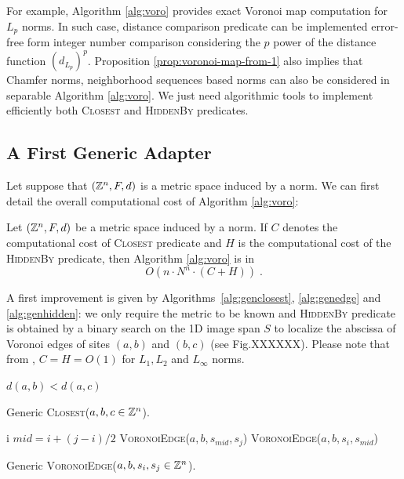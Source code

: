 \documentclass{llncs}
\begin{document}
For example, Algorithm \ref{alg:voro} provides exact Voronoi map
computation for $L_p$ norms. In such case, distance comparison
predicate can be implemented error-free form integer number comparison
considering the $p$ power of the distance function $\left
(d_{L_p}\right)^p$.  Proposition \ref{prop:voronoi-map-from-1} also
implies that Chamfer norms, neighborhood sequences based norms can
also be considered in separable Algorithm \ref{alg:voro}. We just need
algorithmic tools to implement efficiently both \textsc{Closest} and
\textsc{HiddenBy} predicates.

\subsection{A First Generic Adapter}
\label{sec:first-gener-adapt}

Let suppose that $({\mathbb{Z}}^n,F,d)$ is a metric space induced by a norm. We
can first detail the overall computational cost of Algorithm
\ref{alg:voro}:

\begin{lemma}
\label{lem:generic}
   Let $({\mathbb{Z}}^n, F, d)$ be a metric space induced by a norm. If $C$
  denotes the computational cost of \textsc{Closest} predicate and $H$
  is the computational cost of the \textsc{HiddenBy} predicate, then
  Algorithm \ref{alg:voro} is in
  \begin{equation}
    O(n\cdot N^n\cdot (C+H))\;.
  \end{equation}
\end{lemma}


A first improvement is given by Algorithms~\ref{alg:genclosest},
\ref{alg:genedge} and \ref{alg:genhidden}: we only require the metric
to be known and \textsc{HiddenBy} predicate is obtained by a binary
search on the 1D image span $S$ to localize the abscissa of Voronoi
edges of sites $(a,b)$ and $(b,c)$ (see Fig.XXXXXX). Please note that
from \cite{Breu1995,roerdnik}, $C=H=O(1)$ for $L_1,L_2$ and $L_\infty$
norms.



\begin{algorithm}[H]\small
  \Return $d(a,b) < d(a,c)$\;
  \caption{Generic \textsc{Closest}($a,b,c\in{\mathbb{Z}}^n$).\label{alg:genclosest}}
\end{algorithm}


\begin{algorithm}[H]\small
     {
       \Return  i
     }
     $mid  = i + (j-i)/2$\;
       {
         \Return \textsc{VoronoiEdge}($a,b,s_{mid},s_j$)
}
 {
         \Return \textsc{VoronoiEdge}($a,b,s_{i},s_{mid}$)
}

  \caption{Generic \textsc{VoronoiEdge}($a,b,s_i,s_j\in{\mathbb{Z}}^n$).\label{alg:genedge}}
\end{algorithm}
\end{document}
